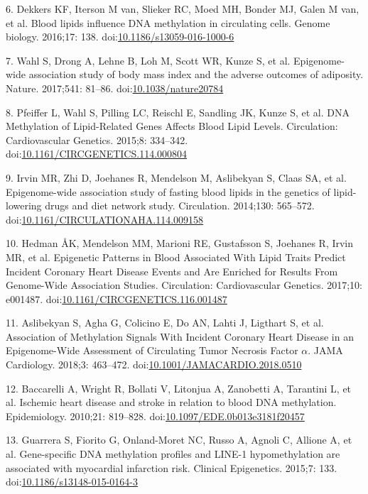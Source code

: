 \documentclass[]{article}
\theoremstyle{definition}
\theoremstyle{definition}
\theoremstyle{definition}
\theoremstyle{remark}
\begin{document}
6. Dekkers KF, Iterson M van, Slieker RC, Moed MH, Bonder MJ, Galen M
van, et al. Blood lipids influence DNA methylation in circulating cells.
Genome biology. 2016;17: 138.
doi:\href{http://dx.doi.org/10.1186/s13059-016-1000-6}{10.1186/s13059-016-1000-6}

7. Wahl S, Drong A, Lehne B, Loh M, Scott WR, Kunze S, et al.
Epigenome-wide association study of body mass index and the adverse
outcomes of adiposity. Nature. 2017;541: 81--86.
doi:\href{http://dx.doi.org/10.1038/nature20784}{10.1038/nature20784}

8. Pfeiffer L, Wahl S, Pilling LC, Reischl E, Sandling JK, Kunze S, et
al. DNA Methylation of Lipid-Related Genes Affects Blood Lipid Levels.
Circulation: Cardiovascular Genetics. 2015;8: 334--342.
doi:\href{http://dx.doi.org/10.1161/CIRCGENETICS.114.000804}{10.1161/CIRCGENETICS.114.000804}

9. Irvin MR, Zhi D, Joehanes R, Mendelson M, Aslibekyan S, Claas SA, et
al. Epigenome-wide association study of fasting blood lipids in the
genetics of lipid-lowering drugs and diet network study. Circulation.
2014;130: 565--572.
doi:\href{http://dx.doi.org/10.1161/CIRCULATIONAHA.114.009158}{10.1161/CIRCULATIONAHA.114.009158}

10. Hedman ÅK, Mendelson MM, Marioni RE, Gustafsson S, Joehanes R, Irvin
MR, et al. Epigenetic Patterns in Blood Associated With Lipid Traits
Predict Incident Coronary Heart Disease Events and Are Enriched for
Results From Genome-Wide Association Studies. Circulation:
Cardiovascular Genetics. 2017;10: e001487.
doi:\href{http://dx.doi.org/10.1161/CIRCGENETICS.116.001487}{10.1161/CIRCGENETICS.116.001487}

11. Aslibekyan S, Agha G, Colicino E, Do AN, Lahti J, Ligthart S, et al.
Association of Methylation Signals With Incident Coronary Heart Disease
in an Epigenome-Wide Assessment of Circulating Tumor Necrosis Factor
\(\alpha\). JAMA Cardiology. 2018;3: 463--472.
doi:\href{http://dx.doi.org/10.1001/JAMACARDIO.2018.0510}{10.1001/JAMACARDIO.2018.0510}

12. Baccarelli A, Wright R, Bollati V, Litonjua A, Zanobetti A,
Tarantini L, et al. Ischemic heart disease and stroke in relation to
blood DNA methylation. Epidemiology. 2010;21: 819--828.
doi:\href{http://dx.doi.org/10.1097/EDE.0b013e3181f20457}{10.1097/EDE.0b013e3181f20457}

13. Guarrera S, Fiorito G, Onland-Moret NC, Russo A, Agnoli C, Allione
A, et al. Gene-specific DNA methylation profiles and LINE-1
hypomethylation are associated with myocardial infarction risk. Clinical
Epigenetics. 2015;7: 133.
doi:\href{http://dx.doi.org/10.1186/s13148-015-0164-3}{10.1186/s13148-015-0164-3}
\end{document}
